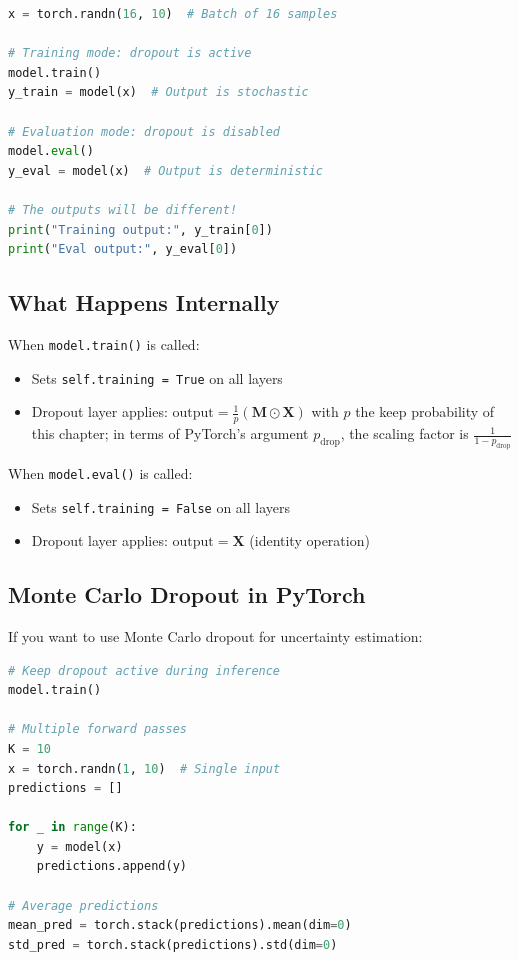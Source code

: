 \begin{notechapter}
\begin{lstlisting}[language=Python]
x = torch.randn(16, 10)  # Batch of 16 samples

# Training mode: dropout is active
model.train()
y_train = model(x)  # Output is stochastic

# Evaluation mode: dropout is disabled
model.eval()
y_eval = model(x)  # Output is deterministic

# The outputs will be different!
print("Training output:", y_train[0])
print("Eval output:", y_eval[0])
\end{lstlisting}

\subsection{What Happens Internally}

When \texttt{model.train()} is called:
\begin{itemize}
    \item Sets \texttt{self.training = True} on all layers
        \item Dropout layer applies: $\text{output} = \frac{1}{p}(\mathbf{M} \odot \mathbf{X})$ with $p$ the keep probability of this chapter; in terms of PyTorch's argument $p_{\text{drop}}$, the scaling factor is $\frac{1}{1 - p_{\text{drop}}}$
\end{itemize}

When \texttt{model.eval()} is called:
\begin{itemize}
    \item Sets \texttt{self.training = False} on all layers  
    \item Dropout layer applies: $\text{output} = \mathbf{X}$ (identity operation)
\end{itemize}

\subsection{Monte Carlo Dropout in PyTorch}

If you want to use Monte Carlo dropout for uncertainty estimation:

\begin{lstlisting}[language=Python]
# Keep dropout active during inference
model.train()

# Multiple forward passes
K = 10
x = torch.randn(1, 10)  # Single input
predictions = []

for _ in range(K):
    y = model(x)
    predictions.append(y)

# Average predictions
mean_pred = torch.stack(predictions).mean(dim=0)
std_pred = torch.stack(predictions).std(dim=0)


\end{lstlisting}
\end{notechapter}
